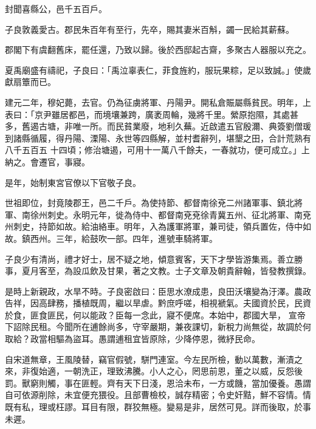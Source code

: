 \begin{pinyinscope}
 封聞喜縣公，邑千五百戶。



 子良敦義愛古。郡民朱百年有至行，先卒，賜其妻米百斛，蠲一民給其薪蘇。



 郡閣下有虞翻舊床，罷任還，乃致以歸。後於西邸起古齋，多聚古人器服以充之。



 夏禹廟盛有禱祀，子良曰：「禹泣辜表仁，菲食旌約，服玩果粽，足以致誠。」使歲獻扇簟而已。



 建元二年，穆妃薨，去官。仍為征虜將軍、丹陽尹。開私倉賑屬縣貧民。明年，上表曰：「京尹雖居都邑，而境壤兼跨，廣袤周輪，幾將千里。縈原抱隰，其處甚多，舊遏古塘，非唯一所。而民貧業廢，地利久蕪。近啟遣五官殷濔、典簽劉僧瑗到諸縣循履，得丹陽、溧陽、永世等四縣解，並村耆辭列，堪墾之田，合計荒熟有八千五百五
 十四頃；修治塘遏，可用十一萬八千餘夫，一春就功，便可成立。」上納之。會遷官，事寢。



 是年，始制東宮官僚以下官敬子良。



 世祖即位，封竟陵郡王，邑二千戶。為使持節、都督南徐兗二州諸軍事、鎮北將軍、南徐州刺史。永明元年，徙為侍中、都督南兗兗徐青冀五州、征北將軍、南兗州刺史，持節如故。給油絡車。明年，入為護軍將軍，兼司徒，領兵置佐，侍中如故。鎮西州。三年，給鼓吹一部。四年，進號車騎將軍。



 子良少有清尚，禮才好士，居不疑之地，傾意賓客，天下才學皆游集焉。善立勝事，夏月客至，為設瓜飲及甘果，著之文教。士子文章及朝貴辭翰，皆發教撰錄。



 是時上新親政，水旱不時。子良密啟曰：臣思水潦成患，良田沃壤變為汙澤。農政告祥，因高肆務，播植既周，繼以旱虐。黔庶呼嗟，相視褫氣。夫國資於民，民資於食，匪食匪民，何以能政？臣每一念此，寢不便席。本始中，郡國大旱，
 宣帝下詔除民租。今聞所在逋餘尚多，守宰嚴期，兼夜課切，新稅力尚無從，故調於何取給？政當相驅為盜耳。愚謂逋租宜皆原除，少降停恩，微紓民命。



 自宋道無章，王風陵替，竊官假號，駢門連室。今左民所檢，動以萬數，漸漬之來，非復始適，一朝洗正，理致沸騰。小人之心，罔思前恩，董之以威，反怨後罰。獸窮則觸，事在匪輕。齊有天下日淺，恩洽未布，一方或饑，當加優養。愚謂自可依源削除，未宜便充猥役。且部曹檢校，誠存精密；令史奸黠，鮮不容情。情既有私，理或枉謬。耳目有限，群狡無極。變易是非，居然可見。詳而後取，於事未遲。




\end{pinyinscope}
